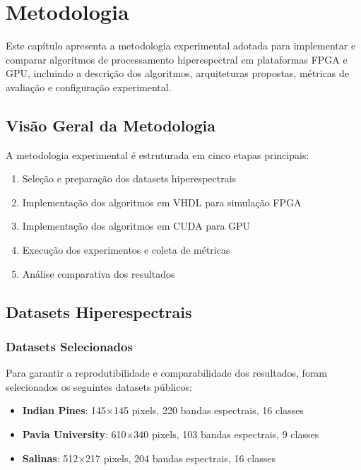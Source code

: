 \chapter{Metodologia}\label{chp:metodologia}

Este capítulo apresenta a metodologia experimental adotada para implementar e comparar algoritmos de processamento hiperespectral em plataformas FPGA e GPU, incluindo a descrição dos algoritmos, arquiteturas propostas, métricas de avaliação e configuração experimental.

\section{Visão Geral da Metodologia}\label{sec:visao_geral}

A metodologia experimental é estruturada em cinco etapas principais:
\begin{enumerate}
    \item Seleção e preparação dos datasets hiperespectrais
    \item Implementação dos algoritmos em VHDL para simulação FPGA
    \item Implementação dos algoritmos em CUDA para GPU
    \item Execução dos experimentos e coleta de métricas
    \item Análise comparativa dos resultados
\end{enumerate}

\section{Datasets Hiperespectrais}\label{sec:datasets}

\subsection{Datasets Selecionados}
Para garantir a reprodutibilidade e comparabilidade dos resultados, foram selecionados os seguintes datasets públicos:

\begin{itemize}
    \item \textbf{Indian Pines}: 145×145 pixels, 220 bandas espectrais, 16 classes
    \item \textbf{Pavia University}: 610×340 pixels, 103 bandas espectrais, 9 classes  
    \item \textbf{Salinas}: 512×217 pixels, 204 bandas espectrais, 16 classes
\end{itemize}

